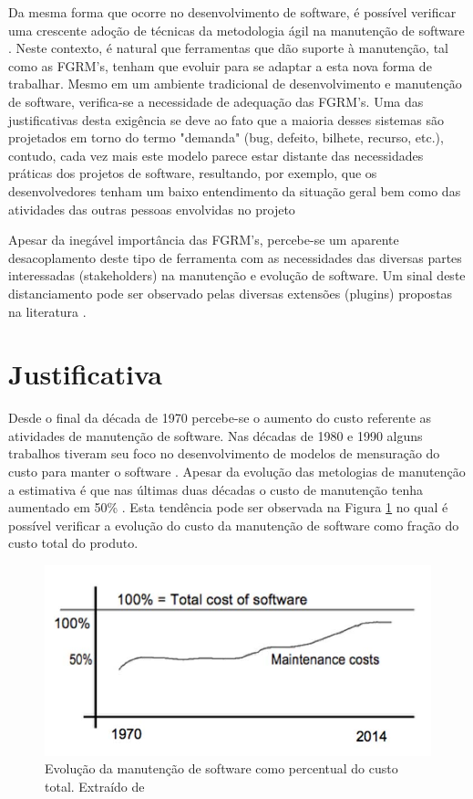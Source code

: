 Da mesma forma que ocorre no desenvolvimento de software, é possível verificar uma crescente adoção
de técnicas da metodologia ágil na manutenção de software \cite{Soltan2016,Devulapally2015,
	Heeager2015}. Neste contexto, é natural que ferramentas que dão suporte à manutenção, tal como
as FGRM's, tenham que evoluir para se adaptar a esta nova forma de trabalhar. Mesmo em um ambiente
tradicional de  desenvolvimento e manutenção de software, verifica-se a necessidade de adequação das
FGRM's. Uma das justificativas desta exigência se deve ao fato que a maioria desses sistemas são
projetados em torno do termo "demanda" (bug, defeito, bilhete, recurso, etc.), contudo, cada vez
mais este modelo parece estar distante das necessidades práticas dos projetos de software,
resultando, por exemplo, que os desenvolvedores tenham um
baixo entendimento da situação geral bem como das atividades das outras pessoas
envolvidas no projeto \cite{Baysal:2013:SAP:2486788.2486957}


Apesar da inegável importância das FGRM's, percebe-se um aparente desacoplamento deste tipo de ferramenta com as necessidades das diversas partes interessadas (stakeholders) na manutenção e evolução de software. Um sinal deste distanciamento pode ser observado pelas diversas extensões (plugins) propostas na literatura \cite{101186,Thung:2014:BIT:2635868.2661678,Kononenko:2014:DED:2591062.2591075}.
 
\section{Justificativa}
\label{sec:intro-justificativa}
Desde o final da década de 1970 \cite{Zelkowitz:1979:PSE:578504} percebe-se o aumento do custo referente as atividades de  manutenção de software. Nas décadas de 1980 e 1990 alguns
trabalhos tiveram seu foco no desenvolvimento de modelos de mensuração do custo
para manter o software \cite{Herrin:1985:SMC:323287.323383,hirota1994approach}. Apesar da evolução das metologias de manutenção a estimativa é que nas últimas duas décadas o custo de manutenção tenha aumentado em 50\% \cite{koskinen2010software}. Esta tendência pode ser observada na Figura \ref{fig:software-maintence-costs} no qual é possível verificar a evolução do custo da manutenção de software como fração do custo total do produto.

\begin{figure}
\centering
\includegraphics[width=0.7\linewidth]{./chapter-intro/img/software-maintence-costs}
\caption{Evolução da manutenção de software como percentual do custo total.	Extraído de	\cite{engelbertink2010save}}

\label{fig:software-maintence-costs}
\end{figure}

